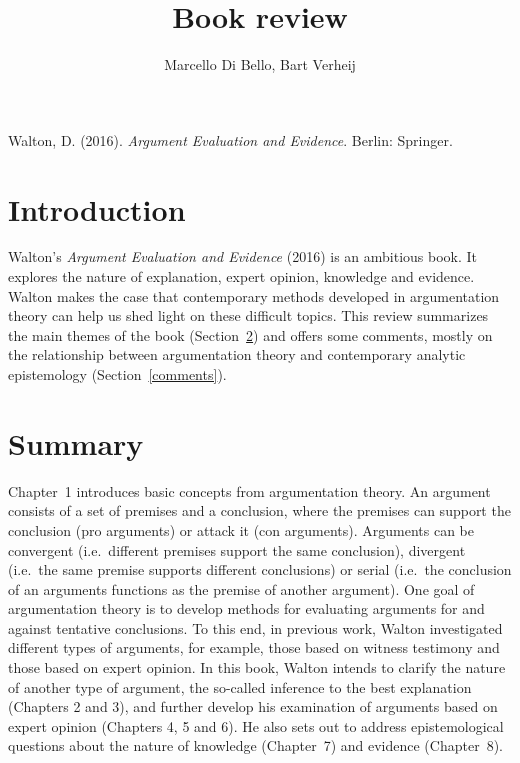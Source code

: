 \documentclass[12pt]{article}
\begin{document}
\title{Book review}

\author{}
\author{Marcello Di Bello, Bart Verheij}

\date{}

\maketitle


Walton, D. (2016). \emph{Argument Evaluation and Evidence}. Berlin: Springer.

\section{Introduction}

\noindent Walton's \emph{Argument Evaluation and Evidence} (2016) is an ambitious book. It explores the nature of explanation,
expert opinion, knowledge and evidence. Walton makes the case that
contemporary methods developed in argumentation theory can help us shed light on these difficult topics.
This review summarizes the main themes of the book (Section~\ref{summary}) and offers some comments, 
mostly on the relationship between argumentation theory and contemporary analytic epistemology (Section~\ref{comments}).

\section{Summary}
\label{summary}
\noindent Chapter~1 introduces basic concepts from argumentation
theory. An argument consists of a set of premises and a conclusion,
where the premises can support the conclusion (pro arguments) or attack
it (con arguments). Arguments can be convergent (i.e.\ different
premises support the same conclusion), divergent (i.e.\ the same
premise supports different conclusions) or serial (i.e.\ the conclusion
of an arguments functions as the premise of another argument).
One goal of argumentation theory is to develop methods for evaluating 
arguments for and against tentative conclusions. To this end, in previous work,
Walton investigated different types of arguments, for example, those
based on witness testimony and those based on expert opinion. In this
book, Walton intends to clarify the nature of another type of
argument, the so-called inference to the best explanation (Chapters 2
and 3), and further develop his examination of arguments based on
expert opinion (Chapters 4, 5 and  6). He also sets out to
address epistemological questions about the nature of knowledge
(Chapter~7) and evidence (Chapter~8).
\end{document}
